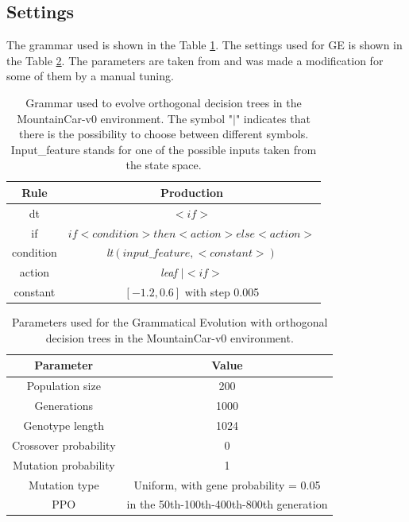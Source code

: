 \subsection{Settings}
\label{subsec:432}
The grammar used is shown in the Table \ref{table:3}. The settings used for GE is shown in the Table \ref{table:4}. The parameters are taken from \cite{custode} and was made a modification for some of them by a manual tuning.


\captionsetup{margin=1.7cm}
\begin{table}[h!]
\begin{center}
\begin{tabular}{ |c|c| }
\hline
\textbf{Rule} & \textbf{Production} \\
\hline
dt & \textit{$< if >$}\\
if & \textit{$if < condition > then < action > else < action >$}\\
condition & \textit{lt$(input\_feature,<constant>)$}\\
action & \textit{leaf $| < if >$}\\
constant & $[-1.2, 0.6]$ with step 0.005\\
\hline
\end{tabular}
\caption{Grammar used to evolve orthogonal decision trees in the MountainCar-v0 environment. The symbol "$|$" indicates that there is the possibility to choose between different symbols. Input\_feature stands for one of the possible inputs taken from the state space.}
\label{table:3}
\end{center}
\end{table}


\begin{table}[h!]
\begin{center}
\begin{tabular}{ |c|c| } 
\hline
\textbf{Parameter} & \textbf{Value} \\
\hline
Population size & 200\\
Generations & 1000\\
Genotype length & 1024\\
Crossover probability & 0\\
Mutation probability & 1\\
Mutation type & Uniform, with gene probability = 0.05\\
PPO & in the 50th-100th-400th-800th generation\\
\hline
\end{tabular}
\caption{Parameters used for the Grammatical Evolution with orthogonal decision trees in the MountainCar-v0 environment.}
\label{table:4}
\end{center}
\end{table}

